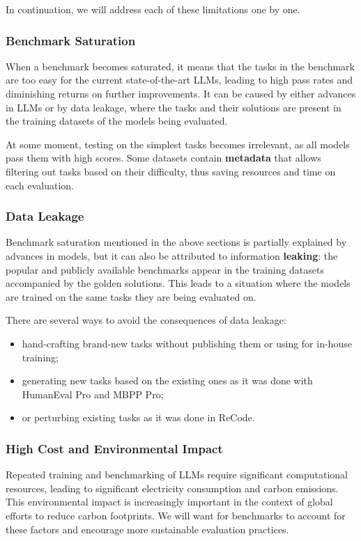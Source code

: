In continuation, we will address each of these limitations one by one.

\subsubsection{Benchmark Saturation}

When a benchmark becomes saturated, it means that the tasks in the benchmark are too easy for the current state-of-the-art LLMs, leading to high pass rates and diminishing returns on further improvements.
It can be caused by either advances in LLMs or by data leakage, where the tasks and their solutions are present in the training datasets of the models being evaluated.

At some moment, testing on the simplest tasks becomes irrelevant, as all models pass them with high scores.
Some datasets contain \textbf{metadata} that allows filtering out tasks based on their difficulty, thus saving resources and time on each evaluation.

\subsubsection{Data Leakage}

Benchmark saturation mentioned in the above sections is partially explained by advances in models, but it can also be attributed to information \textbf{leaking}: the popular and publicly available benchmarks appear in the training datasets accompanied by the golden solutions.
This leads to a situation where the models are trained on the same tasks they are being evaluated on.

There are several ways to avoid the consequences of data leakage:
\begin{itemize}
    \item hand-crafting brand-new tasks without publishing them or using for in-house training;
    \item generating new tasks based on the existing ones as it was done with HumanEval Pro and MBPP Pro;
    \item or perturbing existing tasks as it was done in ReCode.
\end{itemize}

\subsubsection{High Cost and Environmental Impact}

Repeated training and benchmarking of LLMs require significant computational resources, leading to significant electricity consumption and carbon emissions. This environmental impact is increasingly important in the context of global efforts to reduce carbon footprints.
We will want for benchmarks to account for these factors and encourage more sustainable evaluation practices.

